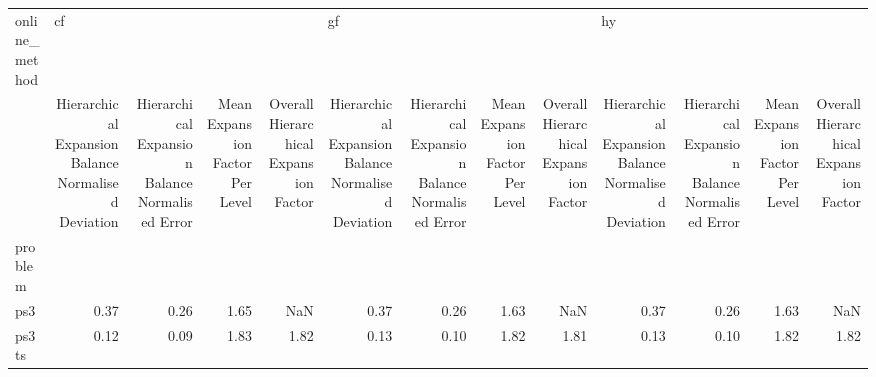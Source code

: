\begin{tabular}{lrrrrrrrrrrrr}
\toprule
online\_method & \multicolumn{4}{l}{cf} & \multicolumn{4}{l}{gf} & \multicolumn{4}{l}{hy} \\
{} & Hierarchical Expansion Balance Normalised Deviation & Hierarchical Expansion Balance Normalised Error & Mean Expansion Factor Per Level & Overall Hierarchical Expansion Factor & Hierarchical Expansion Balance Normalised Deviation & Hierarchical Expansion Balance Normalised Error & Mean Expansion Factor Per Level & Overall Hierarchical Expansion Factor & Hierarchical Expansion Balance Normalised Deviation & Hierarchical Expansion Balance Normalised Error & Mean Expansion Factor Per Level & Overall Hierarchical Expansion Factor \\
problem &                                                     &                                                 &                                 &                                       &                                                     &                                                 &                                 &                                       &                                                     &                                                 &                                 &                                       \\
\midrule
ps3     &                                               0.37 &                                            0.26 &                            1.65 &                                   NaN &                                               0.37 &                                            0.26 &                            1.63 &                                   NaN &                                               0.37 &                                            0.26 &                            1.63 &                                   NaN \\
ps3ts   &                                               0.12 &                                            0.09 &                            1.83 &                                  1.82 &                                               0.13 &                                            0.10 &                            1.82 &                                  1.81 &                                               0.13 &                                            0.10 &                            1.82 &                                  1.82 \\
\bottomrule
\end{tabular}
